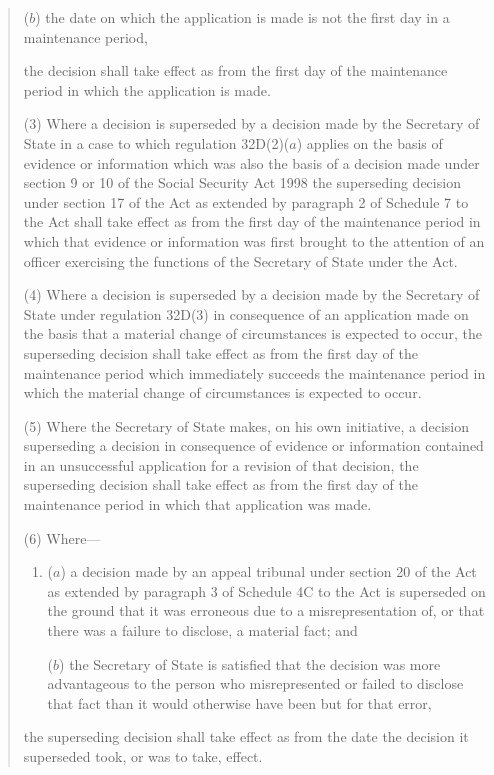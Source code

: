 \documentclass[12pt,a4paper]{article}
\begin{document}
\begin{quotation}
\begin{enumerate}
($b$) the date on which the application is made is not the first day in a maintenance period, 
\end{enumerate}
the decision shall take effect as from the first day of the maintenance period in which the application is made.

(3) Where a decision is superseded by a decision made by the Secretary of State in a case to which regulation 32D(2)($a$) applies on the basis of evidence or information which was also the basis of a decision made under section 9 or 10 of the Social Security Act 1998 the superseding decision under section 17 of the Act as extended by paragraph 2 of Schedule 7 to the Act shall take effect as from the first day of the maintenance period in which that evidence or information was first brought to the attention of an officer exercising the functions of the Secretary of State under the Act.

(4) Where a decision is superseded by a decision made by the Secretary of State under regulation 32D(3) in consequence of an application made on the basis that a material change of circumstances is expected to occur, the superseding decision shall take effect as from the first day of the maintenance period which immediately succeeds the maintenance period in which the material change of circumstances is expected to occur.

(5) Where the Secretary of State makes, on his own initiative, a decision superseding a decision in consequence of evidence or information contained in an unsuccessful application for a revision of that decision, the superseding decision shall take effect as from the first day of the maintenance period in which that application was made.

(6) Where---
\begin{enumerate}\item[]
($a$) a decision made by an appeal tribunal under section 20 of the Act as extended by paragraph 3 of Schedule 4C to the Act is superseded on the ground that it was erroneous due to a misrepresentation of, or that there was a failure to disclose, a material fact; and

($b$) the Secretary of State is satisfied that the decision was more advantageous to the person who misrepresented or failed to disclose that fact than it would otherwise have been but for that error,
\end{enumerate}
the superseding decision shall take effect as from the date the decision it superseded took, or was to take, effect.


\end{quotation}
\end{document}
